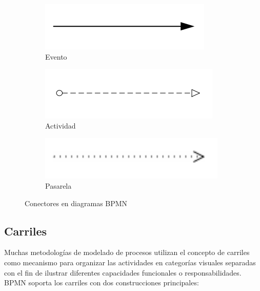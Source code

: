 \begin{figure}[H]
    \centering
    \begin{subfigure}[b]{0.3\textwidth}
        \centering
        \includegraphics[width=\textwidth]{img/bpmn-sequence.png}
        \caption{Evento}
    \end{subfigure}
    \hfill
    \begin{subfigure}[b]{0.3\textwidth}
        \centering
        \includegraphics[width=\textwidth]{img/bpmn-message.png}
        \caption{Actividad}
    \end{subfigure}
    \hfill
    \begin{subfigure}[b]{0.3\textwidth}
        \centering
        \includegraphics[width=\textwidth]{img/bpmn-association.png}
        \caption{Pasarela}
    \end{subfigure}
    \caption{Conectores en diagramas BPMN}
    \label{fig:bpmn-connectors}
\end{figure}

\subsection{Carriles}

Muchas metodologías de modelado de procesos utilizan el concepto de carriles como mecanismo para organizar las actividades en categorías visuales separadas con el fin de ilustrar diferentes capacidades funcionales o responsabilidades.
BPMN soporta los carriles con dos construcciones principales:

